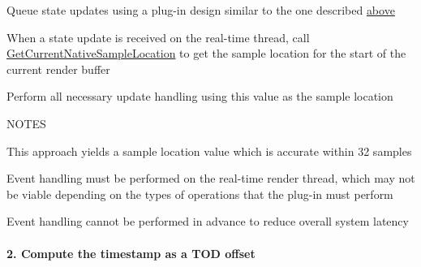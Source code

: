 \begin{DoxyEnumerate}
\item Queue state updates using a plug-\/in design similar to the one described \hyperlink{a00351_parameterUpdateTiming_resolvingOffsets}{above}  
\item When a state update is received on the real-\/time thread, call \hyperlink{a00116_a8119233b03774528ffaa519771d792a0}{Get\+Current\+Native\+Sample\+Location} to get the sample location for the start of the current render buffer  
\item Perform all necessary update handling using this value as the sample location  
\end{DoxyEnumerate}

N\+O\+T\+E\+S \begin{DoxyItemize}
\item This approach yields a sample location value which is accurate within 32 samples \item Event handling must be performed on the real-\/time render thread, which may not be viable depending on the types of operations that the plug-\/in must perform \item Event handling cannot be performed in advance to reduce overall system latency\end{DoxyItemize}
\hypertarget{a00351_parameterUpdateTiming_determiningTimelinePosition_2}{}\paragraph{2. Compute the timestamp as a T\+O\+D offset}\label{a00351_parameterUpdateTiming_determiningTimelinePosition_2}

